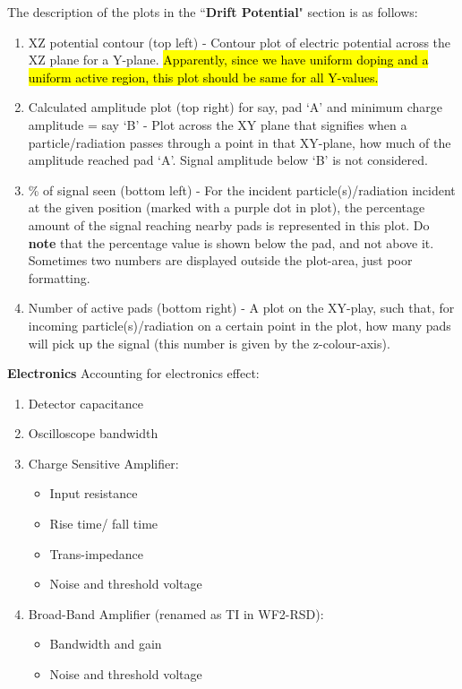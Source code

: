 \documentclass[11pt]{article}
\newcommand{\hlyellow}[1]{{\sethlcolor{yellow}\hl{#1}}}
\begin{document}
\newline
The description of the plots in the ``\textbf{Drift Potential}" section is as follows:
\begin{enumerate}
    \item XZ potential contour (top left) - Contour plot of electric potential across the XZ plane for a Y-plane. \hlyellow{Apparently, since we have uniform doping and a uniform active region, this plot should be same for all Y-values.}
    \item Calculated amplitude plot (top right) for say, pad `A' and minimum charge amplitude = say `B' - Plot across the XY plane that signifies when a particle/radiation passes through a point in that XY-plane, how much of the amplitude reached pad `A'. Signal amplitude below `B' is not considered.
    \item \% of signal seen (bottom left) - For the incident particle(s)/radiation incident at the given position (marked with a purple dot in plot), the percentage amount of the signal reaching nearby pads is represented in this plot. Do \textbf{note} that the percentage value is shown below the pad, and not above it. Sometimes two numbers are displayed outside the plot-area, just poor formatting.
    \item Number of active pads (bottom right) - A plot on the XY-play, such that, for incoming particle(s)/radiation on a certain point in the plot, how many pads will pick up the signal (this number is given by the z-colour-axis).
\end{enumerate}
\newpage
\textbf{Electronics}
Accounting for electronics effect:
\begin{enumerate}
    \item Detector capacitance
    \item Oscilloscope bandwidth
    \item Charge Sensitive Amplifier:
    \begin{itemize}
        \item Input resistance
        \item Rise time/ fall time
        \item Trans-impedance
        \item Noise and threshold voltage
    \end{itemize}
    \item Broad-Band Amplifier (renamed as TI in WF2-RSD):
    \begin{itemize}
        \item Bandwidth and gain
        \item Noise and threshold voltage
    \end{itemize}
\end{enumerate}
\end{document}
